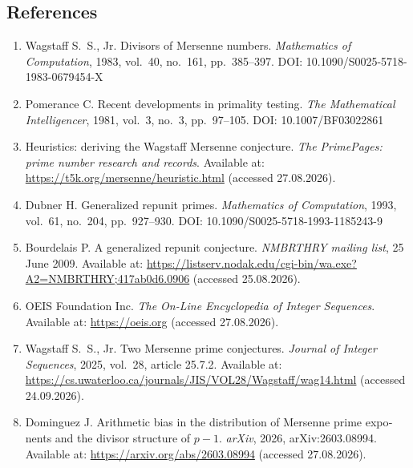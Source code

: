 \documentclass[11pt,a4paper]{article}
\theoremstyle{plain}
\theoremstyle{remark}
\begin{document}
\begin{otherlanguage}{english}
\section*{References}
\begin{enumerate}\itemsep2pt
\item Wagstaff S.~S., Jr. Divisors of Mersenne numbers.
\emph{Mathematics of Computation}, 1983, vol.~40, no.~161, pp.~385--397.
DOI: 10.1090/S0025-5718-1983-0679454-X

\item Pomerance C. Recent developments in primality testing.
\emph{The Mathematical Intelligencer}, 1981, vol.~3, no.~3, pp.~97--105.
DOI: 10.1007/BF03022861

\item Heuristics: deriving the Wagstaff Mersenne conjecture. \emph{The PrimePages:
prime number research and records}. Available at:
\url{https://t5k.org/mersenne/heuristic.html} (accessed 27.08.2026).

\item Dubner H. Generalized repunit primes.
\emph{Mathematics of Computation}, 1993, vol.~61, no.~204, pp.~927--930.
DOI: 10.1090/S0025-5718-1993-1185243-9

\item Bourdelais P. A generalized repunit conjecture. \emph{NMBRTHRY mailing
list}, 25 June 2009. Available at:
\url{https://listserv.nodak.edu/cgi-bin/wa.exe?A2=NMBRTHRY;417ab0d6.0906}
(accessed 25.08.2026).

\item OEIS Foundation Inc. \emph{The On-Line Encyclopedia of Integer
Sequences}. Available at: \url{https://oeis.org} (accessed 27.08.2026).

\item Wagstaff S.~S., Jr. Two Mersenne prime conjectures.
\emph{Journal of Integer Sequences}, 2025, vol.~28, article 25.7.2.
Available at:
\url{https://cs.uwaterloo.ca/journals/JIS/VOL28/Wagstaff/wag14.html}
(accessed 24.09.2026).

\item Dominguez J. Arithmetic bias in the distribution of Mersenne prime exponents
and the divisor structure of $p-1$. \emph{arXiv}, 2026, arXiv:2603.08994. Available
at: \url{https://arxiv.org/abs/2603.08994} (accessed 27.08.2026).


\end{enumerate}
\end{otherlanguage}
\end{document}
